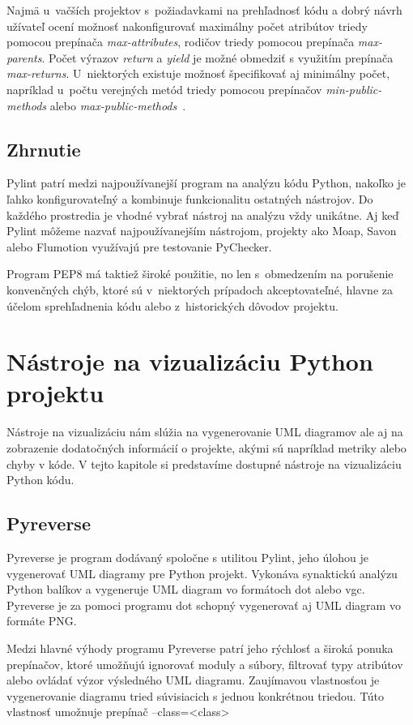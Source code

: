 \documentclass[11pt,oneside,final]{fithesis2}
\begin{document}
    Najmä u~vačších projektov s~požiadavkami na prehľadnosť kódu a dobrý návrh užívateľ ocení možnosť nakonfigurovať maximálny počet atribútov triedy pomocou prepínača \textit{max-attributes}, rodičov triedy pomocou prepínača \textit{max-parents}. Počet výrazov \textit{return} a \textit{yield} je možné obmedziť s využitím prepínača \textit{max-returns}. U~niektorých existuje možnosť špecifikovať aj minimálny počet, napríklad u~počtu verejných metód triedy pomocou prepínačov \textit{min-public-methods} alebo \textit{max-public-methods}~\cite{pylintfeatures}.
    
\subsection{Zhrnutie}
Pylint patrí medzi najpoužívanejší program na analýzu kódu Python, nakoľko je ľahko konfigurovateľný a kombinuje funkcionalitu ostatných nástrojov. Do každého prostredia je vhodné vybrať nástroj na analýzu vždy unikátne. Aj keď Pylint môžeme nazvať najpoužívanejším nástrojom, projekty ako Moap, Savon alebo Flumotion využívajú pre testovanie PyChecker.
    
    Program PEP8 má taktiež široké použitie, no len s~obmedzením na porušenie konvenčných chýb, ktoré  sú v~niektorých prípadoch akceptovateľné, hlavne za účelom sprehľadnenia kódu alebo z~historických dôvodov projektu.
    	
	
	\section{Nástroje na vizualizáciu Python projektu}
	
	Nástroje na vizualizáciu nám slúžia na vygenerovanie UML diagramov ale aj na zobrazenie dodatočných informácií o projekte, akými sú napríklad metriky alebo chyby v kóde. V tejto kapitole si predstavíme dostupné nástroje na vizualizáciu Python kódu.
	
	\subsection{Pyreverse}
		Pyreverse je program dodávaný spoločne s utilitou Pylint, jeho úlohou je vygenerovať UML diagramy pre Python projekt. Vykonáva synaktickú analýzu Python balíkov a vygeneruje UML diagram vo formátoch dot alebo vgc. Pyreverse je za pomoci programu dot schopný vygenerovať aj UML diagram vo formáte PNG.
		
		Medzi hlavné výhody programu Pyreverse patrí jeho rýchlosť a široká ponuka prepínačov, ktoré umožňujú ignorovať moduly a súbory, filtrovať typy atribútov alebo ovládať výzor výsledného UML diagramu.		
		Zaujímavou vlastnosťou je vygenerovanie diagramu tried súvisiacich s jednou konkrétnou triedou. Túto vlastnosť umožnuje prepínač --class=<class>
		
\end{document}
